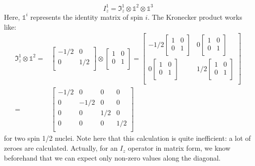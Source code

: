 \documentclass[11pt,a4paper]{article}
\begin{document}
\begin{equation}
  I_z^1 = \mathfrak{I}_z^1  \otimes \mathbb{1}^2 \otimes \mathbb{1}^3
\end{equation}
Here, $\mathbb{1}^i$ represents the identity matrix of spin $i$. The Kronecker product
works like:
\begin{align}
  \mathfrak{I}_z^1  \otimes \mathbb{1}^2 =&
  \begin{bmatrix}
	 -1/2 & 0 \\
	 0 & 1/2 \\
  \end{bmatrix}\otimes
 \begin{bmatrix}
	 1 & 0 \\
	 0 & 1 \\
  \end{bmatrix} = 
 \begin{bmatrix}
	 -1/2\begin{bmatrix}
	 1 & 0 \\
	 0 & 1 \\
  \end{bmatrix}	 
	 & 0 \begin{bmatrix}
	 1 & 0 \\
	 0 & 1 \\
  \end{bmatrix}\\
	 0 \begin{bmatrix}
	 1 & 0 \\
	 0 & 1 \\
  \end{bmatrix}& 1/2 \begin{bmatrix}
	 1 & 0 \\
	 0 & 1 \\
  \end{bmatrix}\\
  \end{bmatrix}\\
  =& \begin{bmatrix}
	 -1/2 & 0 & 0 & 0 \\
	 0 & -1/2 & 0 & 0\\
	 0 & 0 & 1/2 & 0\\
	 0 & 0 & 0 & 1/2\\
  \end{bmatrix}
\end{align}
for two spin 1/2 nuclei. Note here that this calculation is quite inefficient: a lot of
zeroes are calculated. Actually, for an $I_z$ operator in matrix form, we know beforehand
that we can expect only non-zero values along the diagonal.
\end{document}
